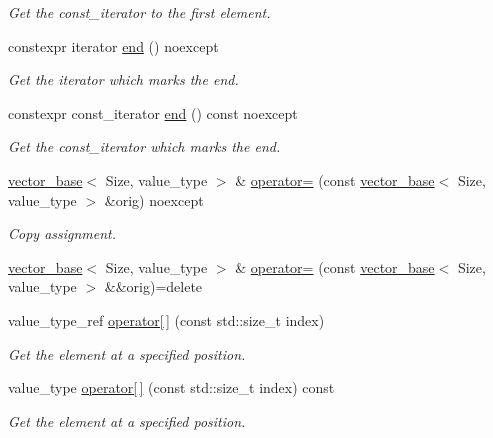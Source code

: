 \begin{DoxyCompactItemize}
\begin{DoxyCompactList}\small\item\em Get the const\+\_\+iterator to the first element. \end{DoxyCompactList}\item 
constexpr iterator \hyperlink{classglpp_1_1vector__base_a67c0770dcf8747d0119b6c32974caa76}{end} () noexcept
\begin{DoxyCompactList}\small\item\em Get the iterator which marks the end. \end{DoxyCompactList}\item 
constexpr const\+\_\+iterator \hyperlink{classglpp_1_1vector__base_a684a3f97ac7edfe4ea265a505f70df74}{end} () const noexcept
\begin{DoxyCompactList}\small\item\em Get the const\+\_\+iterator which marks the end. \end{DoxyCompactList}\item 
\hyperlink{classglpp_1_1vector__base}{vector\+\_\+base}$<$ Size, value\+\_\+type $>$ \& \hyperlink{classglpp_1_1vector__base_a580690059c9ad00c8e4d715a904bb390}{operator=} (const \hyperlink{classglpp_1_1vector__base}{vector\+\_\+base}$<$ Size, value\+\_\+type $>$ \&orig) noexcept
\begin{DoxyCompactList}\small\item\em Copy assignment. \end{DoxyCompactList}\item 
\hyperlink{classglpp_1_1vector__base}{vector\+\_\+base}$<$ Size, value\+\_\+type $>$ \& \hyperlink{classglpp_1_1vector__base_a4fbb93fbc43aa6fb332104aa039991b2}{operator=} (const \hyperlink{classglpp_1_1vector__base}{vector\+\_\+base}$<$ Size, value\+\_\+type $>$ \&\&orig)=delete
\item 
value\+\_\+type\+\_\+ref \hyperlink{classglpp_1_1vector__base_aae72a315ce6ba266b7add4a43a531bb2}{operator\mbox{[}$\,$\mbox{]}} (const std\+::size\+\_\+t index)
\begin{DoxyCompactList}\small\item\em Get the element at a specified position. \end{DoxyCompactList}\item 
value\+\_\+type \hyperlink{classglpp_1_1vector__base_a3b38ee9887188a71120db98da6795cd3}{operator\mbox{[}$\,$\mbox{]}} (const std\+::size\+\_\+t index) const
\begin{DoxyCompactList}\small\item\em Get the element at a specified position. \end{DoxyCompactList}\end{DoxyCompactItemize}
